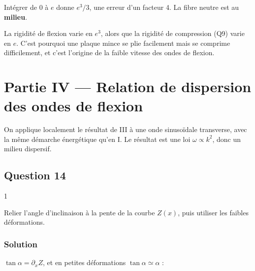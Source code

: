 \documentclass[11pt,a4paper]{article}
\newcommand{\equationajustee}[1]{%
  \sbox{\boiteequation}{$\displaystyle #1$}%
  \ifdim\wd\boiteequation>\linewidth
    \[\resizebox{\linewidth}{!}{\usebox{\boiteequation}}\]%
  \else
    \[#1\]%
  \fi}
\begin{document}
\equationajustee{\boxed{E_p^L=\frac1{24}K\frac{Lle^3}{R_C^2}}}

\equationajustee{\boxed{A=\frac1{24}}}

\begin{piege}

Intégrer de \(0\) à \(e\) donne \(e^3/3\), une erreur d'un facteur 4. La fibre neutre est au \textbf{milieu}.

\end{piege}

\begin{methode}

La rigidité de flexion varie en \(e^3\), alors que la rigidité de compression (Q9) varie en \(e\). C'est pourquoi une plaque mince se plie facilement mais se comprime difficilement, et c'est l'origine de la faible vitesse des ondes de flexion.

\end{methode}

\hypertarget{partie-iv-relation-de-dispersion-des-ondes-de-flexion}{%
\section{Partie IV --- Relation de dispersion des ondes de flexion}\label{partie-iv-relation-de-dispersion-des-ondes-de-flexion}}

On applique localement le résultat de III à une onde sinusoïdale transverse, avec la même démarche énergétique qu'en I. Le résultat est une loi \(\omega\propto k^2\), donc un milieu dispersif.

\hypertarget{question-14}{%
\subsection{Question 14}\label{question-14}}

\begin{indication}{1}

Relier l'angle d'inclinaison à la pente de la courbe \(Z(x)\), puis utiliser les faibles déformations.

\end{indication}

\hypertarget{solution-13}{%
\subsubsection{Solution}\label{solution-13}}

\(\tan\alpha=\partial_xZ\), et en petites déformations \(\tan\alpha\simeq\alpha\) :
\end{document}
